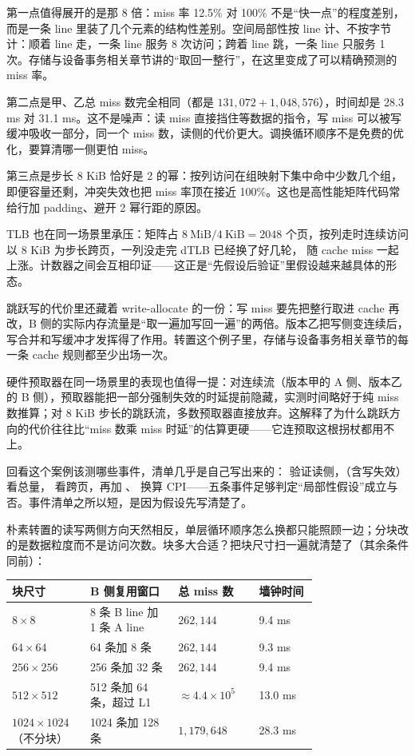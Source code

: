 第一点值得展开的是那 8 倍：miss 率 12.5\% 对 100\% 不是“快一点”的程度差别，而是一条 line 里装了几个元素的结构性差别。空间局部性按 line 计、不按字节计：顺着 line 走，一条 line 服务 8 次访问；跨着 line 跳，一条 line 只服务 1 次。存储与设备事务相关章节讲的“取回一整行”，在这里变成了可以精确预测的 miss 率。

第二点是甲、乙总 miss 数完全相同（都是 $131{,}072+1{,}048{,}576$），时间却是 28.3 ms 对 31.1 ms。这不是噪声：读 miss 直接挡住等数据的指令，写 miss 可以被写缓冲吸收一部分，同一个 miss 数，读侧的代价更大。调换循环顺序不是免费的优化，要算清哪一侧更怕 miss。

第三点是步长 8 KiB 恰好是 2 的幂：按列访问在组映射下集中命中少数几个组，即便容量还剩，冲突失效也把 miss 率顶在接近 100\%。这也是高性能矩阵代码常给行加 padding、避开 2 幂行距的原因。

TLB 也在同一场景里承压：矩阵占 $8\ \mathrm{MiB}/4\ \mathrm{KiB}=2048$ 个页，按列走时连续访问以 8 KiB 为步长跨页，一列没走完 dTLB 已经换了好几轮， 随 cache miss 一起上涨。计数器之间会互相印证——这正是“先假设后验证”里假设越来越具体的形态。

跳跃写的代价里还藏着 write-allocate 的一份：写 miss 要先把整行取进 cache 再改，B 侧的实际内存流量是“取一遍加写回一遍”的两倍。版本乙把写侧变连续后，写合并和写缓冲才发挥得了作用。转置这个例子里，存储与设备事务相关章节的每一条 cache 规则都至少出场一次。

硬件预取器在同一场景里的表现也值得一提：对连续流（版本甲的 A 侧、版本乙的 B 侧），预取器能把一部分强制失效的时延提前隐藏，实测时间略好于纯 miss 数推算；对 8 KiB 步长的跳跃流，多数预取器直接放弃。这解释了为什么跳跃方向的代价往往比“miss 数乘 miss 时延”的估算更硬——它连预取这根拐杖都用不上。

回看这个案例该测哪些事件，清单几乎是自己写出来的： 验证读侧，（含写失效）看总量， 看跨页，再加 、 换算 CPI——五条事件足够判定“局部性假设”成立与否。事件清单之所以短，是因为假设先写清楚了。

朴素转置的读写两侧方向天然相反，单层循环顺序怎么换都只能照顾一边；分块改的是数据粒度而不是访问次数。块多大合适？把块尺寸扫一遍就清楚了（其余条件同前）：

\begin{longtable}{L{0.16\linewidth}L{0.24\linewidth}L{0.20\linewidth}L{0.16\linewidth}}
\toprule
块尺寸 & B 侧复用窗口 & 总 miss 数 & 墙钟时间 \\
\midrule
$8\times8$ & 8 条 B line 加 1 条 A line & $262{,}144$ & 9.4 ms \\\tablerowrule
$64\times64$ & 64 条加 8 条 & $262{,}144$ & 9.3 ms \\\tablerowrule
$256\times256$ & 256 条加 32 条 & $262{,}144$ & 9.4 ms \\\tablerowrule
$512\times512$ & 512 条加 64 条，超过 L1 & $\approx4.4\times10^{5}$ & 13.0 ms \\\tablerowrule
$1024\times1024$（不分块） & 1024 条加 128 条 & $1{,}179{,}648$ & 28.3 ms \\
\bottomrule
\end{longtable}

